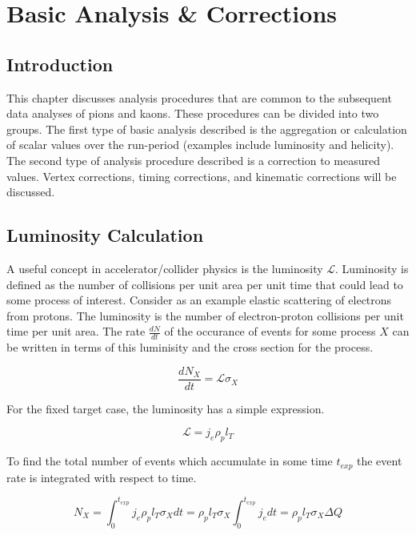 \chapter{Basic Analysis \& Corrections}

\section{Introduction}
This chapter discusses analysis procedures that are common to the subsequent data analyses of pions and kaons.  These procedures can be divided into two groups.  The first type of basic analysis described is the aggregation or calculation of scalar values over the run-period (examples include luminosity and helicity).  The second type of analysis procedure described is a correction to measured values.  Vertex corrections, timing corrections, and kinematic corrections will be discussed.


\section{Luminosity Calculation}
A useful concept in accelerator/collider physics is the luminosity $\mathcal{L}$.  Luminosity is defined as the number of collisions per unit area per unit time that could lead to some process of interest.  Consider as an example elastic scattering of electrons from protons.  The luminosity is the number of electron-proton collisions per unit time per unit area.  The rate $\frac{dN}{dt}$ of the occurance of events for some process $X$ can be written in terms of this luminisity and the cross section for the process.

\begin{equation}
	\frac{dN_X}{dt} = \mathcal{L} \sigma_X 
\end{equation}

For the fixed target case, the luminosity has a simple expression.

\begin{equation}
	\mathcal{L} = j_e \rho_p l_T 
\end{equation}

To find the total number of events which accumulate in some time $t_{exp}$ the event rate is integrated with respect to time.

\begin{equation}
	N_X = \int_{0}^{t_{exp}} j_e \rho_p l_T \sigma_X dt = \rho_p l_T \sigma_X \int_{0}^{t_{exp}} j_e dt =  \rho_p l_T \sigma_X \Delta Q
\end{equation}

